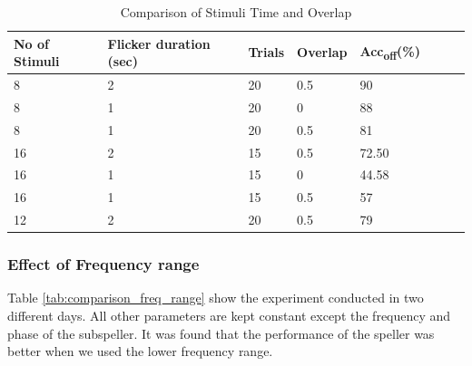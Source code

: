 \begin{table}[h]
\small
\caption{Comparison of Stimuli Time and Overlap}
\label{tab:comparison_stimuli_time_overlap}
\begin{tabular}{@{}p{1.2cm} p{2.5cm} p{2cm} p{1.8cm} p{1.7cm} p{1.5cm} p{2cm} p{2cm}@{}}
\toprule
No of Stimuli  & Flicker   duration (sec) & Trials & Overlap & Acc\textsubscript{off}(\%) \\ \midrule
8                      & 2                        & 20                            & 0.5                     & 90                     \\
8                    & 1                        & 20                             & 0                       & 88                 \\
8                  & 1                        & 20                          & 0.5                     & 81                     \\
16                  & 2                        & 15                          & 0.5                     & 72.50                     \\
16                & 1                        & 15                            & 0                       & 44.58 \\
16 &1  & 15                           & 0.5                     & 57                       \\
12             & 2                      & 20                         & 0.5           & 79               \\\bottomrule
\end{tabular}
\end{table}

\subsubsection{Effect of Frequency range}

Table \ref{tab:comparison_freq_range} show the experiment conducted in two different days. All other parameters are kept constant except the frequency and phase of the subspeller. It was found that the performance of the speller was better when we used the lower frequency range.

